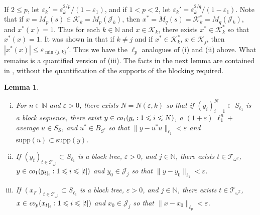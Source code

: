 \documentclass[12pt]{amsart}
\newtheorem{lemma}[theorem]{Lemma}
\theoremstyle{definition}
\newcommand{\nn}{\mathbb{N}}
\newcommand{\kkk}{\mathcal{K}}
\newcommand{\ttt}{\mathcal{T}}
\newcommand{\jjj}{\mathcal{J}}
\newcommand{\supp}{\mathrm{supp}}
\begin{document}
If $2\leqslant p$, let $\varepsilon_k'=\varepsilon_k^{2/p}/(1-\varepsilon_1)$, and if $1<p<2$, let $\varepsilon_k'=\varepsilon_k^{2/q}/(1-\varepsilon_1)$.  Note that if $x= M_p(s)\in \kkk_k=M_p(\jjj_k)$, then $x^*=M_q(s)= \kkk^*_k=M_q(\jjj_k)$, and $x^*(x)= 1$.  Thus for each $k\in \nn$ and $x\in \kkk_k$, there exists $x^*\in \kkk_k^*$ so that $x^*(x)=1$.  It was shown in \cite{OS} that if $k\neq j$ and if $x^*\in \kkk_k^*$, $x\in \kkk_j$, then $|x^*(x)|\leqslant \varepsilon_{\min \{j,k\}}'$.  Thus we have the $\ell_p$ analogues of (i) and (ii) above.  What remains is a quantified version of (iii).  The facts in the next lemma are contained in \cite{OS}, without the quantification of the supports of the blocking required.  


\begin{lemma} \begin{enumerate}[(i)]\item For $n\in \nn$ and $\varepsilon>0$, there exists $N=N(\varepsilon, k)$ so that if $(y_i)_{i=1}^N\subset S_{\ell_1}$ is a block sequence, there exist $y\in \emph{\text{co}}_1(y_i:1\leqslant i\leqslant N)$, a $(1+\varepsilon)$ $\ell_1^n+$ average $u\in S_S$, and $u^*\in B_{S^*}$ so that $\|y - u^*u\|_{\ell_1}< \varepsilon$ and $\supp(u)\subset \supp(y)$. \item If $(y_t)_{t\in \ttt_{\omega^2}}\subset S_{\ell_1}$ is a block tree, $\varepsilon>0$, and $j\in \nn$, there exists $t\in \ttt_{\omega^2}$, $y\in \emph{\text{co}}_1(y_{t|_i}:1\leqslant i\leqslant |t|)$ and $y_0\in \jjj_j$ so that $\|y- y_0\|_{\ell_1}<\varepsilon$. \item  If $(x_F)_{t\in \ttt_{\omega^2}}\subset S_{\ell_1}$ is a block tree, $\varepsilon>0$, and $j\in \nn$, there exists $t\in \ttt_{\omega^2}$, $x\in \emph{\text{co}}_p(x_{t|_i}:1\leqslant i\leqslant |t|)$ and $x_0\in \jjj_j$ so that $\|x- x_0\|_{\ell_p}<\varepsilon$.


\end{enumerate}


\label{prime lemma}
\end{lemma}
\end{document}
